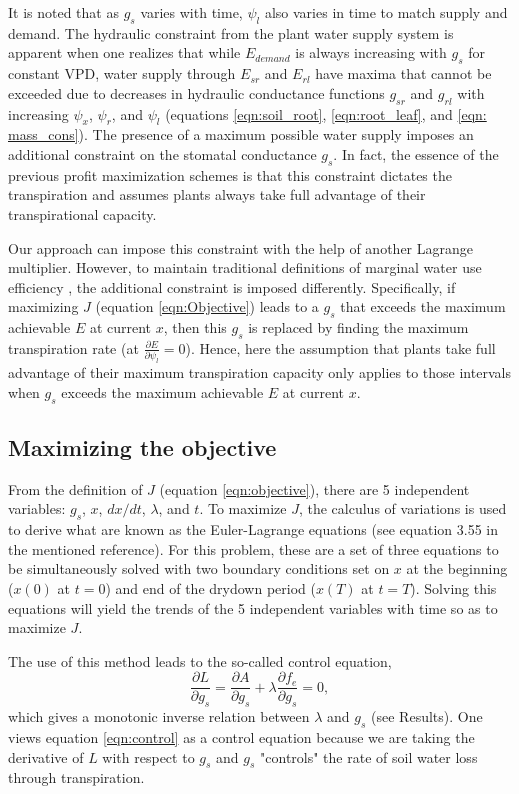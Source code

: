 \documentclass[utf8]{frontiersSCNS} %
\begin{document}
It is noted that as $g_s$ varies with time, $\psi_l$ also varies in time to match supply and demand. The hydraulic constraint from the plant water supply system is apparent when one realizes that while $E_{demand}$ is always increasing with $g_s$ for constant VPD, water supply through $E_{sr}$ and $E_{rl}$ have maxima that cannot be exceeded due to decreases in hydraulic conductance functions $g_{sr}$ and $g_{rl}$ with increasing $\psi_x$, $\psi_r$, and $\psi_l$ (equations \ref{eqn:soil_root}, \ref{eqn:root_leaf}, and \ref{eqn: mass_cons}). The presence of a maximum possible water supply imposes an additional constraint on the stomatal conductance $g_s$.  In fact, the essence of the previous profit maximization schemes is that this constraint dictates the transpiration and assumes plants always take full advantage of their transpirational capacity.

Our approach can impose this constraint with the help of another Lagrange multiplier. However, to maintain traditional definitions of marginal water use efficiency \citep{cowan_stomatal_1977}, the additional constraint is imposed differently. Specifically, if maximizing $J$ (equation \ref{eqn:Objective}) leads to a $g_s$ that exceeds the maximum achievable $E$ at current $x$, then this $g_s$ is replaced by finding the maximum transpiration rate \Big(at $\frac{\partial E}{\partial \psi_l} = 0$\Big). Hence, here the assumption that plants take full advantage of their maximum transpiration capacity only applies to those intervals when $g_s$ exceeds the maximum achievable $E$ at current $x$.

\subsection{Maximizing the objective}

From the definition of $J$ (equation \ref{eqn:objective}), there are 5 independent variables: $g_s$, $x$, $dx / dt$, $\lambda$, and $t$. To maximize $J$, the calculus of variations \citep{witelski_variational_2015} is used to derive what are known as the Euler-Lagrange equations (see equation 3.55 in the mentioned reference). For this problem, these are a set of three equations to be simultaneously solved with two boundary conditions set on $x$ at the beginning ($x(0)$ at $t=0$) and end of the drydown period ($x(T)$ at $t=T$). Solving this equations will yield the trends of the 5 independent variables with time so as to maximize $J$.

The use of this method leads to the so-called control equation,
\begin{equation}
    \label{eqn:control}
    \frac{\partial L}{\partial g_s} = \frac{\partial A}{\partial g_s} + \lambda \frac{\partial f_e}{\partial g_s} = 0,
\end{equation}
which gives a monotonic inverse relation between $\lambda$ and $g_s$ (see Results). One views equation \ref{eqn:control} as a control equation because we are taking the derivative of $L$ with respect to $g_s$ and $g_s$ "controls" the rate of soil water loss through transpiration. 
\end{document}
